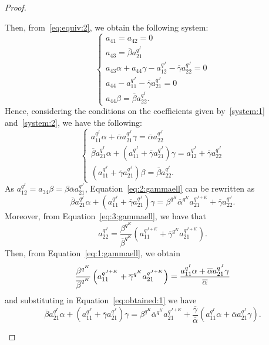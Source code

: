 \begin{proof}
\begin{enumerate}
Then, from~\eqref{eq:equiv:2}, we obtain the following system:
\begin{equation}
\label{system:2}
    \begin{cases}
        a_{41} = a_{42} = 0\\
        a_{43} = \overline{\beta}a_{21}^{q^I}\\
        a_{43}\alpha + a_{44}\gamma - a_{12}^{q^J} - \overline{\gamma}a_{22}^{q^J} = 0\\
        a_{44} - a_{11}^{q^J} - \overline{\gamma}a_{21}^{q^J} = 0\\
        a_{44}\beta = \overline{\beta}a_{22}^{q^I}.
    \end{cases}
\end{equation}
Hence, considering the conditions on the coefficients {given by~\eqref{system:1} and~\eqref{system:2},} 
we have the following:
   $$ \begin{cases}
    a_{11}^{q^I}\alpha + \overline{\alpha}a_{21}^{q^J}\gamma = \overline{\alpha}a_{22}^{q^J} \label{eq:1:gammaell}\\
    \overline{\beta}a_{21}^{q^I}\alpha + \left(a_{11}^{q^J} + \overline{\gamma}a_{21}^{q^J}\right)\gamma = a_{12}^{q^J} + \overline{\gamma}a_{22}^{q^J} \label{eq:2:gammaell}\\
    \left(a_{11}^{q^J} + \overline{\gamma}a_{21}^{q^J}\right)\beta = \overline{\beta}a_{22}^{q^I}. \label{eq:3:gammaell}
    \end{cases}$$
As $a_{12}^{q^I} = a_{34}\beta = \beta\overline{\alpha}a_{21}^{q^J}$, Equation~\eqref{eq:2:gammaell} can be rewritten as 
\begin{equation}
\label{eq:obtained:1}
    \overline{\beta}a_{21}^{q^I}\alpha + \left(a_{11}^{q^J} + \overline{\gamma}a_{21}^{q^J}\right)\gamma = \beta^{q^K}\overline{\alpha}^{q^K}a_{21}^{q^{J+K}} + \overline{\gamma}a_{22}^{q^J}.
\end{equation}
Moreover, from Equation~\eqref{eq:3:gammaell}, we have that
\begin{equation*}
  a_{22}^{q^J} = \frac{\beta^{q^K}}{\overline{\beta}^{q^K}}\left(a_{11}^{q^{J+K}} + \overline{\gamma}^{q^K}a_{21}^{q^{J+K}}\right).
\end{equation*}
Then, from Equation~\eqref{eq:1:gammaell}, we obtain
\begin{equation}
\label{eq:obtained:a_{22}}
\frac{\beta^{q^K}}{\overline{\beta}^{q^K}}\left(a_{11}^{q^{J+K}} + \overline{\gamma}^{q^K}a_{21}^{q^{J+K}}\right) = \frac{a_{11}^{q^I}\alpha + \overline{\alpha}a_{21}^{q^J}\gamma}{\overline{\alpha}}
\end{equation}
and substituting in Equation~\eqref{eq:obtained:1} we have
\begin{equation}
\label{eq:obtained:2}
    \overline{\beta}a_{21}^{q^I}\alpha + \left(a_{11}^{q^J} + \overline{\gamma}a_{21}^{q^J}\right)\gamma = \beta^{q^K}\overline{\alpha}^{q^K}a_{21}^{q^{J+K}} + \frac{\overline{\gamma}}{\overline{\alpha}}\left(a_{11}^{q^I}\alpha + \overline{\alpha}a_{21}^{q^J}\gamma\right).
\end{equation}


\end{enumerate}
\end{proof}
